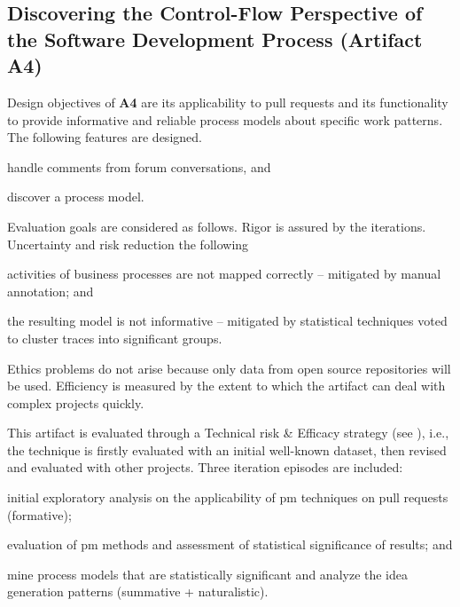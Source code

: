 \subsection{Discovering the Control-Flow Perspective of the Software Development Process (Artifact A4)} 
Design objectives of \textbf{A4} are its applicability to pull requests and its functionality to provide informative and reliable process models about specific work patterns. The following features are designed.
\begin{iiilist}
	\item handle comments from forum conversations, and
	\item discover a process model.
\end{iiilist}
Evaluation goals are considered as follows. Rigor is assured by the iterations. Uncertainty and risk reduction the following
\begin{iiilist}
	\item activities of business processes are not mapped correctly -- mitigated by manual annotation; and
	\item the resulting model is not informative -- mitigated by statistical techniques voted to cluster traces into significant groups.
\end{iiilist} Ethics problems do not arise because only data from open source repositories will be used. Efficiency is measured by the extent to which the artifact can deal with complex projects quickly.

This artifact is evaluated through a Technical risk \& Efficacy strategy (see \cite{Venable2016}), i.e., the technique is firstly evaluated with an initial well-known dataset, then revised and evaluated with other projects. Three iteration episodes are included: 
\begin{iiilist}
	\item initial exploratory analysis on the applicability of \gls{pm} techniques on pull requests (formative);
	\item evaluation of \gls{pm} methods and assessment of statistical significance of results; and
	\item mine process models that are statistically significant and analyze the idea generation patterns (summative + naturalistic).
\end{iiilist}



